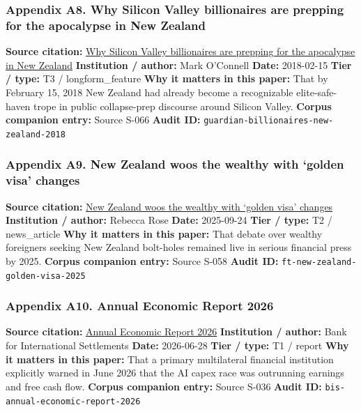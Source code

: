 \documentclass[
  american,
  11pt,
  letterpaper,
]{article}
\begin{document}
\subsubsection{Appendix A8. Why Silicon Valley billionaires are prepping
for the apocalypse in New
Zealand}\label{ch-09-appendix-a8-why-silicon-valley-billionaires-are-prepping-for-the-apocalypse-in-new-zealand}

\textbf{Source citation:}
\href{https://www.theguardian.com/news/2018/feb/15/why-silicon-valley-billionaires-are-prepping-for-the-apocalypse-in-new-zealand}{Why
Silicon Valley billionaires are prepping for the apocalypse in New
Zealand} \textbf{Institution / author:} Mark O'Connell \textbf{Date:}
2018-02-15 \textbf{Tier / type:} T3 / longform\_feature \textbf{Why it
matters in this paper:} That by February 15, 2018 New Zealand had
already become a recognizable elite-safe-haven trope in public
collapse-prep discourse around Silicon Valley. \textbf{Corpus companion
entry:} Source S-066 \textbf{Audit ID:}
\texttt{guardian-billionaires-new-zealand-2018}

\subsubsection{Appendix A9. New Zealand woos the wealthy with `golden
visa'
changes}\label{ch-09-appendix-a9-new-zealand-woos-the-wealthy-with-golden-visa-changes}

\textbf{Source citation:}
\href{https://www.ft.com/content/76ca455c-3b16-4413-8738-3f17431d125b}{New
Zealand woos the wealthy with `golden visa' changes} \textbf{Institution
/ author:} Rebecca Rose \textbf{Date:} 2025-09-24 \textbf{Tier / type:}
T2 / news\_article \textbf{Why it matters in this paper:} That debate
over wealthy foreigners seeking New Zealand bolt-holes remained live in
serious financial press by 2025. \textbf{Corpus companion entry:} Source
S-058 \textbf{Audit ID:} \texttt{ft-new-zealand-golden-visa-2025}

\subsubsection{Appendix A10. Annual Economic Report
2026}\label{ch-09-appendix-a10-annual-economic-report-2026}

\textbf{Source citation:}
\href{https://www.bis.org/publ/arpdf/ar2026e.pdf}{Annual Economic Report
2026} \textbf{Institution / author:} Bank for International Settlements
\textbf{Date:} 2026-06-28 \textbf{Tier / type:} T1 / report \textbf{Why
it matters in this paper:} That a primary multilateral financial
institution explicitly warned in June 2026 that the AI capex race was
outrunning earnings and free cash flow. \textbf{Corpus companion entry:}
Source S-036 \textbf{Audit ID:} \texttt{bis-annual-economic-report-2026}
\end{document}
